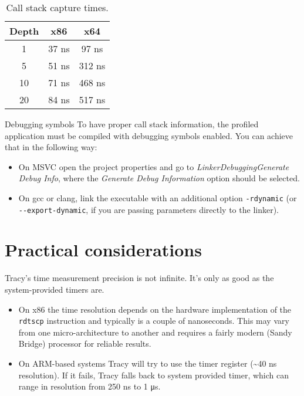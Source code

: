 \documentclass[hidelinks,titlepage,a4paper]{article}
\begin{document}
\begin{table}[h]
\centering
\begin{tabular}[h]{c|c|c}
Depth & x86 & x64 \\ \hline
1 & 37 \si{\nano\second} & 97 \si{\nano\second} \\
5 & 51 \si{\nano\second} & 312 \si{\nano\second} \\
10 & 71 \si{\nano\second} & 468 \si{\nano\second} \\
20 & 84 \si{\nano\second} & 517 \si{\nano\second}
\end{tabular}
\caption{Call stack capture times.}
\label{CallstackTimes}
\end{table}

\begin{bclogo}[
noborder=true,
couleur=black!5,
logo=\bcattention
]{Debugging symbols}
To have proper call stack information, the profiled application must be compiled with debugging symbols enabled. You can achieve that in the following way:

\begin{itemize}
\item On MSVC open the project properties and go to \emph{Linker\textrightarrow Debugging\textrightarrow Generate Debug Info}, where the \emph{Generate Debug Information} option should be selected.
\item On gcc or clang, link the executable with an additional option \texttt{-rdynamic} (or \texttt{-{}-export-dynamic}, if you are passing parameters directly to the linker).
\end{itemize}
\end{bclogo}

\section{Practical considerations}

Tracy's time measurement precision is not infinite. It's only as good as the system-provided timers are.

\begin{itemize}
\item On x86 the time resolution depends on the hardware implementation of the \texttt{rdtscp} instruction and typically is a couple of nanoseconds. This may vary from one micro-architecture to another and requires a fairly modern (Sandy Bridge) processor for reliable results.
\item On ARM-based systems Tracy will try to use the timer register (\textasciitilde 40 \si{\nano\second} resolution). If it fails, Tracy falls back to system provided timer, which can range in resolution from 250 \si{\nano\second} to 1 \si{\micro\second}.
\end{itemize}
\end{document}
